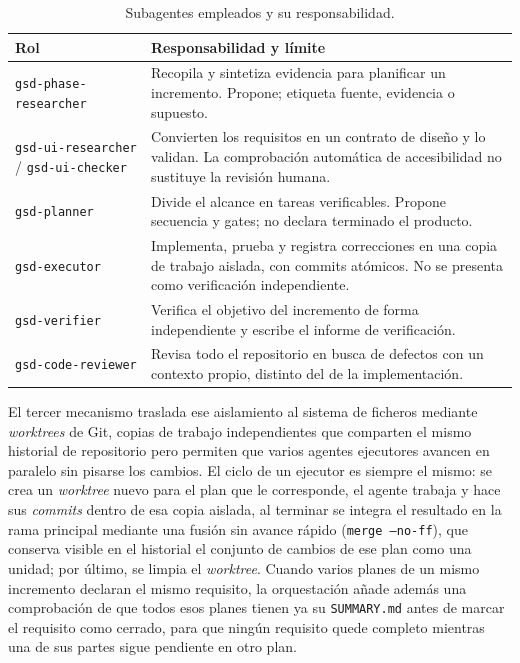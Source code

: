 \begin{table}[H]
\centering
\begin{tabularx}{\textwidth}{ | L{0.34\textwidth} | Y | }
    \hline
    \textbf{Rol} & \textbf{Responsabilidad y límite} \\
    \hline
    \texttt{gsd-phase-researcher} & Recopila y sintetiza evidencia para planificar un incremento. Propone; etiqueta fuente, evidencia o supuesto. \\
    \hline
    \texttt{gsd-ui-researcher} / \texttt{gsd-ui-checker} & Convierten los requisitos en un contrato de diseño y lo validan. La comprobación automática de accesibilidad no sustituye la revisión humana. \\
    \hline
    \texttt{gsd-planner} & Divide el alcance en tareas verificables. Propone secuencia y gates; no declara terminado el producto. \\
    \hline
    \texttt{gsd-executor} & Implementa, prueba y registra correcciones en una copia de trabajo aislada, con commits atómicos. No se presenta como verificación independiente. \\
    \hline
    \texttt{gsd-verifier} & Verifica el objetivo del incremento de forma independiente y escribe el informe de verificación. \\
    \hline
    \texttt{gsd-code-reviewer} & Revisa todo el repositorio en busca de defectos con un contexto propio, distinto del de la implementación. \\
    \hline
\end{tabularx}
\caption{Subagentes empleados y su responsabilidad.}
\label{tab:subagentes}
\end{table}

El tercer mecanismo traslada ese aislamiento al sistema de ficheros mediante \textit{worktrees} de Git, copias de trabajo independientes que
comparten el mismo historial de repositorio pero permiten que varios agentes ejecutores avancen
en paralelo sin pisarse los cambios. El ciclo de un ejecutor es siempre el mismo: se crea un
\textit{worktree} nuevo para el plan que le corresponde, el agente trabaja y hace sus
\textit{commits} dentro de esa copia aislada, al terminar se integra el resultado en la rama
principal mediante una fusión sin avance rápido (\texttt{merge --no-ff}), que conserva visible
en el historial el conjunto de cambios de ese plan como una unidad; por último, se limpia el
\textit{worktree}. Cuando varios planes de un mismo incremento declaran el mismo requisito, la
orquestación añade además una comprobación de que todos esos planes tienen ya su
\texttt{SUMMARY.md} antes de marcar el requisito como cerrado, para que ningún requisito quede
completo mientras una de sus partes sigue pendiente en otro plan.

